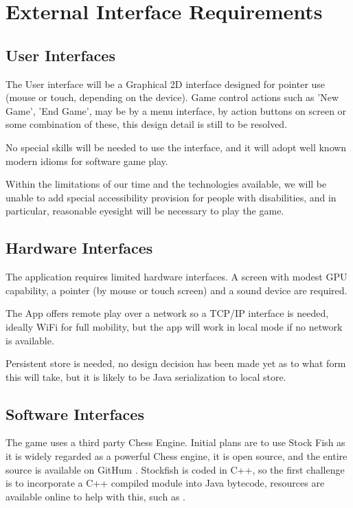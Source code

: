 \documentclass[a4paper,10pt]{article}
\begin{document}
\section{External Interface Requirements}
\subsection{User Interfaces}

The User interface will be a Graphical 2D interface designed for pointer use (mouse or touch, depending on the device). Game control actions such as 'New Game', 'End Game', may be by a menu interface, by action buttons on screen or some combination of these, this design detail is still to be resolved. 

No special skills will be needed to use the interface, and it will adopt well known modern idioms for software game play.

Within the limitations of our time and the technologies available, we will be unable to add special accessibility provision for people with disabilities, and in particular, reasonable eyesight will be necessary to play the game. 

\subsection{Hardware Interfaces}

The application requires limited hardware interfaces. A screen with modest GPU capability, a pointer (by mouse or touch screen) and a sound device are required. 

The App offers remote play over a network so a TCP/IP interface  is needed, ideally WiFi for full mobility, but the app will work in local mode if no network is available. 

Persistent store is needed, no design decision has been made yet as to what form this will take, but it is likely to be Java serialization to local store. 

\subsection{Software Interfaces}


The game uses a third party Chess Engine. Initial plans are to use Stock Fish \cite{stockfish}
as it is widely regarded as a powerful Chess engine, it is open source, and the entire source is available on GitHum \cite{stockfish-github}. Stockfish is coded in C++, so the first challenge is to incorporate a C++ compiled module into Java bytecode, resources are available online to help with this, such as \cite{javaStockfish}. 
\end{document}
